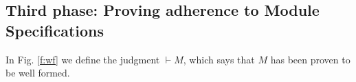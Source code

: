 %
%
%




\subsection{Third phase: Proving adherence to Module Specifications}
\label{sect:wf}

In Fig. \ref{f:wf} we  define the judgment $\vdash M$, which says that %
$M$ has been proven to be well formed. 



